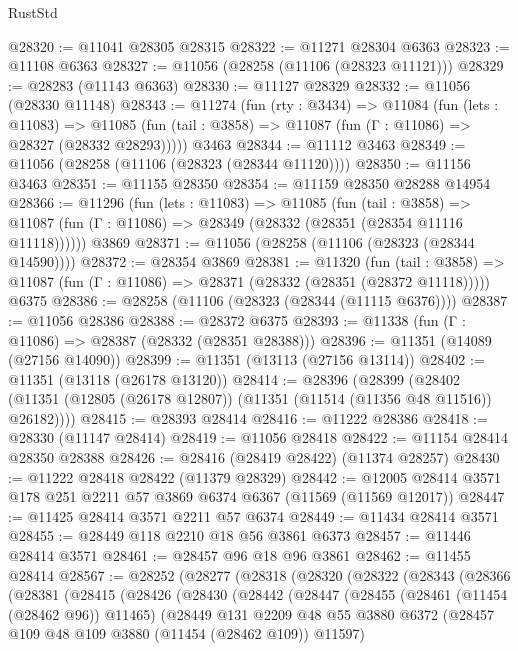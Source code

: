 \begin{lexlean}{RustStd}
\begin{coremodule}
@28320 := @11041 @28305 @28315
@28322 := @11271 @28304 @6363
@28323 := @11108 @6363
@28327 := @11056 (@28258 (@11106 (@28323 @11121)))
@28329 := @28283 (@11143 @6363)
@28330 := @11127 @28329
@28332 := @11056 (@28330 @11148)
@28343 := @11274
    (fun (rty : @3434) =>
    @11084
      (fun (lets : @11083) =>
      @11085 (fun (tail : @3858) => @11087 (fun (Γ : @11086) => @28327 (@28332 @28293)))))
    @3463
@28344 := @11112 @3463
@28349 := @11056 (@28258 (@11106 (@28323 (@28344 @11120))))
@28350 := @11156 @3463
@28351 := @11155 @28350
@28354 := @11159 @28350 @28288 @14954
@28366 := @11296
    (fun (lets : @11083) =>
    @11085
      (fun (tail : @3858) =>
      @11087 (fun (Γ : @11086) => @28349 (@28332 (@28351 (@28354 @11116 @11118))))))
    @3869
@28371 := @11056 (@28258 (@11106 (@28323 (@28344 @14590))))
@28372 := @28354 @3869
@28381 := @11320
    (fun (tail : @3858) => @11087 (fun (Γ : @11086) => @28371 (@28332 (@28351 (@28372 @11118)))))
    @6375
@28386 := @28258 (@11106 (@28323 (@28344 (@11115 @6376))))
@28387 := @11056 @28386
@28388 := @28372 @6375
@28393 := @11338 (fun (Γ : @11086) => @28387 (@28332 (@28351 @28388)))
@28396 := @11351 (@14089 (@27156 @14090))
@28399 := @11351 (@13113 (@27156 @13114))
@28402 := @11351 (@13118 (@26178 @13120))
@28414 := @28396
    (@28399 (@28402 (@11351 (@12805 (@26178 @12807)) (@11351 (@11514 (@11356 @48 @11516)) @26182))))
@28415 := @28393 @28414
@28416 := @11222 @28386
@28418 := @28330 (@11147 @28414)
@28419 := @11056 @28418
@28422 := @11154 @28414 @28350 @28388
@28426 := @28416 (@28419 @28422) (@11374 @28257)
@28430 := @11222 @28418 @28422 (@11379 @28329)
@28442 := @12005 @28414 @3571 @178 @251 @2211 @57 @3869 @6374 @6367 (@11569 (@11569 @12017))
@28447 := @11425 @28414 @3571 @2211 @57 @6374
@28449 := @11434 @28414 @3571
@28455 := @28449 @118 @2210 @18 @56 @3861 @6373
@28457 := @11446 @28414 @3571
@28461 := @28457 @96 @18 @96 @3861
@28462 := @11455 @28414
@28567 := @28252
    (@28277
      (@28318
        (@28320
          (@28322
            (@28343
              (@28366
                (@28381
                  (@28415
                    (@28426
                      (@28430
                        (@28442
                          (@28447
                            (@28455
                              (@28461 (@11454 (@28462 @96)) @11465)
                              (@28449
                                @131
                                @2209
                                @48
                                @55
                                @3880
                                @6372
                                (@28457 @109 @48 @109 @3880 (@11454 (@28462 @109)) @11597)

\end{coremodule}
\end{lexlean}
